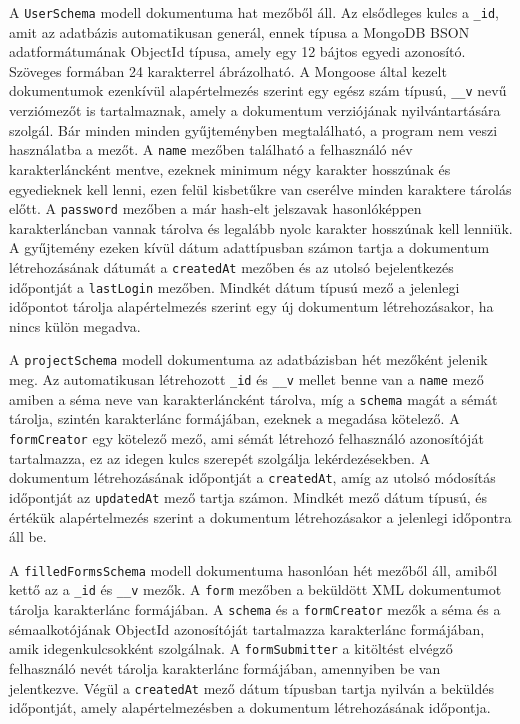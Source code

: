 A \texttt{UserSchema} modell dokumentuma hat mezőből áll. Az elsődleges kulcs a \texttt{\_id}, amit az adatbázis automatikusan generál, ennek típusa a MongoDB BSON adatformátumának ObjectId típusa, amely egy 12 bájtos egyedi azonosító. Szöveges formában 24 karakterrel ábrázolható. A Mongoose által kezelt dokumentumok ezenkívül alapértelmezés szerint egy egész szám típusú, \texttt{\_\_v} nevű verziómezőt is tartalmaznak, amely a dokumentum verziójának nyilvántartására szolgál. Bár minden minden gyűjteményben megtalálható, a program nem veszi használatba a mezőt. A \texttt{name} mezőben található a felhasználó név karakterláncként mentve, ezeknek minimum négy karakter hosszúnak és egyedieknek kell lenni, ezen felül kisbetűkre van cserélve minden karaktere tárolás előtt. A \texttt{password} mezőben a már hash-elt jelszavak hasonlóképpen karakterláncban vannak tárolva és legalább nyolc karakter hosszúnak kell lenniük. A gyűjtemény ezeken kívül dátum adattípusban számon tartja a dokumentum létrehozásának dátumát a \texttt{createdAt} mezőben és az utolsó bejelentkezés időpontját a \texttt{lastLogin} mezőben. Mindkét dátum típusú mező a jelenlegi időpontot tárolja alapértelmezés szerint egy új dokumentum létrehozásakor, ha nincs külön megadva.

A \texttt{projectSchema} modell dokumentuma az adatbázisban hét mezőként jelenik meg. Az automatikusan létrehozott \texttt{\_id} és \texttt{\_\_v} mellet benne van a \texttt{name} mező amiben a séma neve van karakterláncként tárolva, míg a \texttt{schema} magát a sémát tárolja, szintén karakterlánc formájában, ezeknek a megadása kötelező. A \texttt{formCreator} egy kötelező mező, ami sémát létrehozó felhasználó azonosítóját tartalmazza, ez az idegen kulcs szerepét szolgálja lekérdezésekben. A dokumentum létrehozásának időpontját a \texttt{createdAt}, amíg az utolsó módosítás időpontját az \texttt{updatedAt} mező tartja számon. Mindkét mező dátum típusú, és értékük alapértelmezés szerint a dokumentum létrehozásakor a jelenlegi időpontra áll be.

A \texttt{filledFormsSchema} modell dokumentuma hasonlóan hét mezőből áll, amiből kettő az a \texttt{\_id} és \texttt{\_\_v} mezők. A \texttt{form} mezőben a beküldött XML dokumentumot tárolja karakterlánc formájában. A \texttt{schema} és a \texttt{formCreator} mezők a séma és a sémaalkotójának ObjectId azonosítóját tartalmazza karakterlánc formájában, amik idegenkulcsokként szolgálnak. A \texttt{formSubmitter} a kitöltést elvégző felhasználó nevét tárolja karakterlánc formájában, amennyiben be van jelentkezve. Végül a \texttt{createdAt} mező dátum típusban tartja nyilván a beküldés időpontját, amely alapértelmezésben a dokumentum létrehozásának időpontja.

